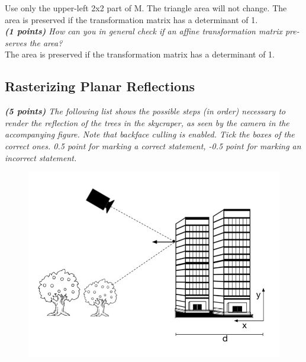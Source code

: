 \documentclass[a4paper,10pt]{article}
\begin{document}
Use only the upper-left 2x2 part of M. The triangle area will not change. The area is preserved if the transformation matrix has a determinant of 1.\\


\textit{\textbf{(1 points)} How can you in general check if an affine transformation matrix pre- serves the area?
}\\

The area is preserved if the transformation matrix has a determinant of 1.

\subsection{Rasterizing Planar Reflections}
\textit{\textbf{(5 points)} The following list shows the possible steps (in order) necessary to render the reflection of the trees in the skycraper, as seen by the camera in the accompanying figure. Note that backface culling is enabled. Tick the boxes of the correct ones. 0.5 point for marking a correct statement, -0.5 point for marking an incorrect statement.}\\
\begin{figure}[H]
	\centering	
	\includegraphics[width=.3\textwidth]{2-4-rasterizing}
\end{figure}
\end{document}
